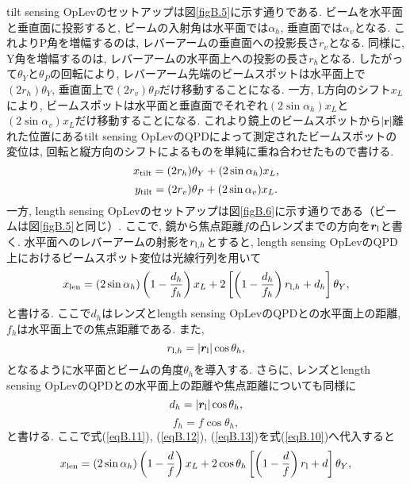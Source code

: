 tilt sensing OpLevのセットアップは図\ref{figB.5}に示す通りである. 
ビームを水平面と垂直面に投影すると, ビームの入射角は水平面では$\alpha_h$, 垂直面では$\alpha_v$となる. これよりP角を増幅するのは, レバーアームの垂直面への投影長さ$r_v$となる. 同様に, Y角を増幅するのは, レバーアームの水平面上への投影の長さ$r_h$となる. したがって$\theta_Y$と$\theta_P$の回転により, レバーアーム先端のビームスポットは水平面上で$(2r_h)\theta_Y$, 垂直面上で$(2r_v)\theta_P$だけ移動することになる. 一方, L方向のシフト$x_L$により, ビームスポットは水平面と垂直面でそれぞれ$(2\sin\alpha_h)x_L$と$(2\sin\alpha_v)x_L$だけ移動することになる. これより鏡上のビームスポットから$|\bm{r}|$離れた位置にあるtilt sensing OpLevのQPDによって測定されたビームスポットの変位は, 回転と縦方向のシフトによるものを単純に重ね合わせたもので書ける. 
\begin{equation}
x_{\rm tilt}=(2r_h)\theta_Y+(2\sin\alpha_h)x_L,
\label{eqB.8}
\end{equation}
\begin{equation}
y_{\rm tilt}=(2r_v)\theta_P+(2\sin\alpha_v)x_L.
\label{eqB.9}
\end{equation}
\quad 一方, length sensing OpLevのセットアップは図\ref{figB.6}に示す通りである（ビームは図\ref{figB.5}と同じ）. ここで, 鏡から焦点距離$f$の凸レンズまでの方向を$\bm{r}_{\rm l}$と書く. 水平面へのレバーアームの射影を$r_{{\rm l},h}$とすると, length sensing OpLevのQPD上におけるビームスポット変位は光線行列を用いて
\begin{equation}
x_{\rm len}=(2\sin\alpha_h)\left(1-\frac{d_h}{f_h}\right)x_L+2\left[\left(1-\frac{d_h}{f_h}\right)r_{{\rm l},h}+d_h\right]\theta_Y,
\label{eqB.10}
\end{equation}
と書ける. ここで$d_h$はレンズとlength sensing OpLevのQPDとの水平面上の距離, $f_h$は水平面上での焦点距離である. また, 
\begin{equation}
r_{{\rm l},h}=|\bm{r}_{\rm l}|\cos\theta_h,
\label{eqB.11}
\end{equation}
となるように水平面とビームの角度$\theta_h$を導入する. さらに, レンズとlength sensing OpLevのQPDとの水平面上の距離や焦点距離についても同様に
\begin{equation}
d_h=|\bm{r}_{\rm l}|\cos\theta_h,
\label{eqB.12}
\end{equation}
\begin{equation}
f_h=f\cos\theta_h,
\label{eqB.13}
\end{equation}
と書ける. ここで式(\ref{eqB.11}), (\ref{eqB.12}), (\ref{eqB.13})を式(\ref{eqB.10})へ代入すると
\begin{equation}
x_{\rm len}=(2\sin\alpha_h)\left(1-\frac{d}{f}\right)x_L+2\cos\theta_h\left[\left(1-\frac{d}{f}\right)r_{\rm l}+d\right]\theta_Y,
\end{equation}
